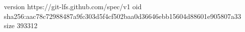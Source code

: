 version https://git-lfs.github.com/spec/v1
oid sha256:aac78c72988487a9fc303d5f4cf502baa0d36646ebb15604d88601e905807a33
size 393312

